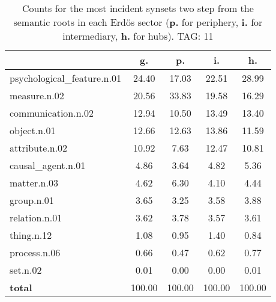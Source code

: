 \begin{table}[h!]
\begin{center}
\begin{tabular}{| l || c | c | c | c |}\hline
 & {\bf g.} & {\bf p.} & {\bf i.} & {\bf h.} \\\hline\hline
psychological\_feature.n.01 & 24.40  & 17.03  & 22.51  & 28.99 \\\hline
measure.n.02 & 20.56  & 33.83  & 19.58  & 16.29 \\\hline
communication.n.02 & 12.94  & 10.50  & 13.49  & 13.40 \\\hline
object.n.01 & 12.66  & 12.63  & 13.86  & 11.59 \\\hline
attribute.n.02 & 10.92  & 7.63  & 12.47  & 10.81 \\\hline
causal\_agent.n.01 & 4.86  & 3.64  & 4.82  & 5.36 \\\hline
matter.n.03 & 4.62  & 6.30  & 4.10  & 4.44 \\\hline
group.n.01 & 3.65  & 3.25  & 3.58  & 3.88 \\\hline
relation.n.01 & 3.62  & 3.78  & 3.57  & 3.61 \\\hline
thing.n.12 & 1.08  & 0.95  & 1.40  & 0.84 \\\hline
process.n.06 & 0.66  & 0.47  & 0.62  & 0.77 \\\hline
set.n.02 & 0.01  & 0.00  & 0.00  & 0.01 \\\hline\hline
{{\bf total}} & 100.00  & 100.00  & 100.00  & 100.00 \\\hline
\end{tabular}
\caption{Counts for the most incident synsets two step from the semantic roots in each Erd\"os sector ({\bf p.} for periphery, {\bf i.} for intermediary, {\bf h.} for hubs). TAG: 11}
\end{center}
\end{table}